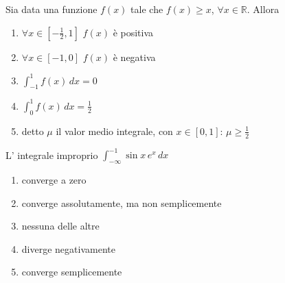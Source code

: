 \begin{quiz}
Sia data una funzione $f(x)$ tale che $f(x)\ge x$, $\forall x\in\mathbb R$. Allora
\begin{enumerate}
\item $\forall x\in[-\frac12,1]$ $f(x)$ \`e positiva
\item $\forall x\in[-1,0]$ $f(x)$ \`e negativa
\item $\displaystyle\int_{-1}^1f(x)\,dx=0$
\item $\displaystyle\int_0^1f(x)\,dx=\frac12$
\item detto $\mu$ il valor medio integrale, con $x\in[0,1]$: $\mu\ge\frac12$
\end{enumerate}
\end{quiz}

\begin{quiz}
L' integrale improprio $\displaystyle\int_{-\infty}^{-1}\sin x\,e^x\,dx$
\begin{enumerate}
\item converge a zero
\item converge assolutamente, ma non semplicemente
\item nessuna delle altre
\item diverge negativamente
\item converge semplicemente
\end{enumerate}
\end{quiz}

